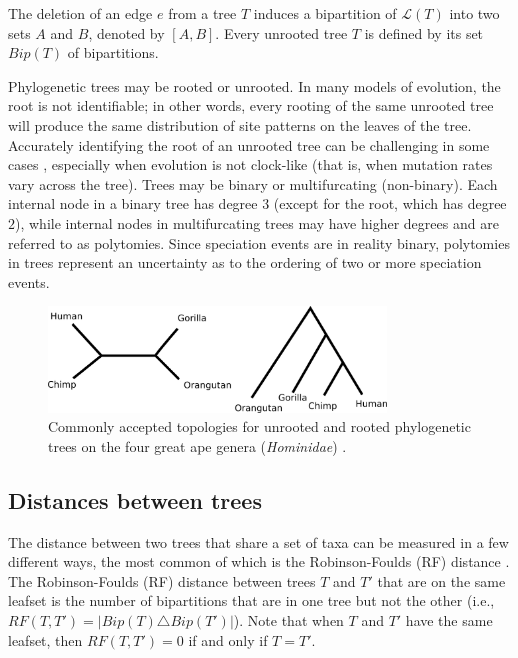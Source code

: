 \documentclass[tocnosub,noragright,centerchapter,fullpagesingle,12pt]{uiuc_csthesis18}
\begin{document}
The deletion of an edge $e$ from a tree $T$ induces a 
bipartition of $\mathcal{L}(T)$ into two sets $A$ and $B$,
denoted by $[A,B]$. Every unrooted 
tree $T$ is defined by its set $Bip(T)$ of bipartitions. 


Phylogenetic trees may be rooted or unrooted. In many models of
evolution, the root is not identifiable; in other words, every rooting
of the same unrooted tree will produce the same distribution of site
patterns on the leaves of the tree. Accurately identifying the root of
an unrooted tree can be challenging in some cases \cite{tian2017rooting,boykin2010comparison}, especially when evolution is not clock-like (that is, when mutation rates vary across the tree).
Trees may be binary or multifurcating (non-binary). Each internal node
in a binary tree has degree $3$ (except for the root, which has degree
$2$), while internal nodes in multifurcating trees may have higher
degrees and are referred to as polytomies. Since speciation events are in reality binary,
polytomies in trees represent an uncertainty as to the ordering
of two or more speciation events.

\begin{figure}
    \centering
    \includegraphics[width=0.8\textwidth]{example-tree.png}
    \caption{Commonly accepted topologies for unrooted and rooted phylogenetic trees on the four great ape genera (\emph{Hominidae}) \cite{wilson2005mammal}.}
    \label{fig:example-tree}
\end{figure}

\subsection{Distances between trees}

The distance between two trees that share a set of taxa can be
measured in a few different ways, the most common of which is the
Robinson-Foulds (RF) distance \cite{robinson1981comparison}. 
The Robinson-Foulds (RF) distance between trees $T$ and $T'$ that are on the same leafset is the number of bipartitions that are in one tree but not the other (i.e., $RF(T,T') = |Bip(T) \triangle Bip(T')|$). Note that when $T$ and $T'$ have the same leafset, then $RF(T,T')=0$ if and only if $T=T'$.
\end{document}
